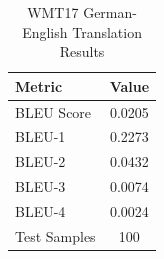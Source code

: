 \begin{table}[h]
\centering
\caption{WMT17 German-English Translation Results}
\label{tab:wmt_results}
\begin{tabular}{lc}
\toprule
Metric & Value \\
\midrule
BLEU Score & 0.0205 \\
BLEU-1 & 0.2273 \\
BLEU-2 & 0.0432 \\
BLEU-3 & 0.0074 \\
BLEU-4 & 0.0024 \\
Test Samples & 100 \\
\bottomrule
\end{tabular}
\end{table}